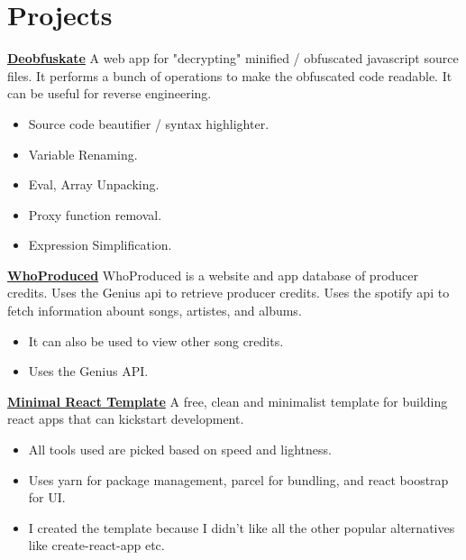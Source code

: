 \section{Projects}
\begin{experience}{\href{https://deminifyjs.netlify.app/}{\textbf{Deobfuskate}}}{
}
A web app for "decrypting" minified / obfuscated javascript source files.
It performs a bunch of operations to make the obfuscated code readable.
It can be useful for reverse engineering.
\begin{itemize}
	\item Source code beautifier / syntax highlighter.
	\item Variable Renaming.
	\item Eval, Array Unpacking.
	\item Proxy function removal.
	\item Expression Simplification.
\end{itemize}
\end{experience}

\begin{experience}{\href{http://whoproduced.herokuapp.com}{\textbf{WhoProduced}}}{
}
WhoProduced is a website and app database of producer credits.
Uses the Genius api to retrieve producer credits.
Uses the spotify api to fetch information abount songs, artistes, and albums.

\begin{itemize}
	\item It can also be used to view other song credits.
	\item Uses the Genius API.
\end{itemize}

\end{experience}

\begin{experience}{\href{https://github.com/foderking/Minimal-React-Template.git}{\textbf{Minimal React Template}}}{
}
A free, clean and minimalist template for building react apps that can kickstart development.

\begin{itemize}
	\item All tools used are picked based on speed and lightness.
	\item Uses yarn for package management, parcel for bundling, and react boostrap for UI.
	\item I created the template because I didn't like all the other popular alternatives like create-react-app etc.
\end{itemize}

\end{experience}


